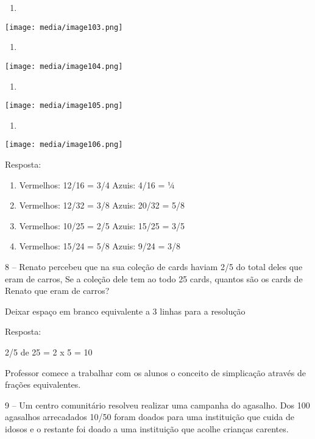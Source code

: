 \begin{enumerate}
\def\labelenumi{\alph{enumi})}
\item
\end{enumerate}

\texttt{[image: media/image103.png]}

\begin{enumerate}
\def\labelenumi{\alph{enumi})}
\item
\end{enumerate}

\texttt{[image: media/image104.png]}

\begin{enumerate}
\def\labelenumi{\alph{enumi})}
\item
\end{enumerate}

\texttt{[image: media/image105.png]}

\begin{enumerate}
\def\labelenumi{\alph{enumi})}
\item
\end{enumerate}

\texttt{[image: media/image106.png]}

Resposta:

\begin{enumerate}
\def\labelenumi{\alph{enumi})}
\item
  Vermelhos: 12/16 = 3/4 Azuis: 4/16 = ¼
\item
  Vermelhos: 12/32 = 3/8 Azuis: 20/32 = 5/8
\item
  Vermelhos: 10/25 = 2/5 Azuis: 15/25 = 3/5
\item
  Vermelhos: 15/24 = 5/8 Azuis: 9/24 = 3/8
\end{enumerate}

8 -- Renato percebeu que na sua coleção de cards haviam 2/5 do total
deles que eram de carros, Se a coleção dele tem ao todo 25 cards,
quantos são os cards de Renato que eram de carros?

Deixar espaço em branco equivalente a 3 linhas para a resolução

Resposta:

2/5 de 25 = 2 x 5 = 10

Professor comece a trabalhar com os alunos o conceito de simplicação
através de frações equivalentes.

9 -- Um centro comunitário resolveu realizar uma campanha do agasalho.
Dos 100 agasalhos arrecadados 10/50 foram doados para uma instituição
que cuida de idosos e o restante foi doado a uma instituição que acolhe
crianças carentes.

